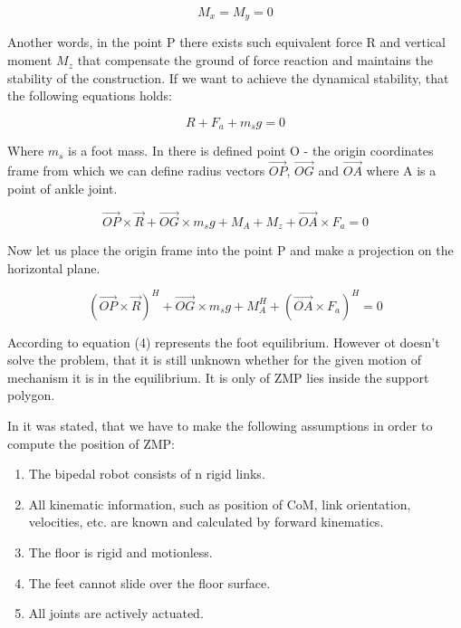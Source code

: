\documentclass[11pt,a4paper]{article}
\begin{document}
	\begin{equation}
		M_x = M_y = 0
	\end{equation}

Another words, in the point P there exists such equivalent force R and vertical moment $M_z$ that compensate the ground of force reaction and maintains the stability of the construction. If we want to achieve the dynamical stability, that the following equations holds:

	\begin{equation}
		R + F_a + m_sg = 0
	\end{equation}

Where $m_s$ is a foot mass. In \cite{vukobratovic2004zero} there is defined  point O - the origin coordinates frame from which we can define radius vectors $\vec{OP}$, $\vec{OG}$ and $\vec{OA}$ where A is a point of ankle joint.

	\begin{equation}
		\vec{OP} \times \vec{R} + \vec{OG} \times m_sg + M_A + M_z + \vec{OA} \times F_a = 0
	\end{equation}

Now let us place the origin frame into the point P and make a projection on the horizontal plane. 

	\begin{equation}
		(\vec{OP} \times \vec{R})^H + \vec{OG} \times m_sg + M_A^H + (\vec{OA} \times F_a)^H = 0
	\end{equation}

According to \cite{vukobratovic2004zero} equation (4) represents the foot equilibrium. However ot doesn't solve the problem, that it is still unknown whether for the given motion of mechanism it is in the equilibrium. It is only of ZMP lies inside the support polygon.

In \cite{dekker2009zero} it was stated, that we have to make the following assumptions in order to compute the position of ZMP:

	\begin{enumerate}
		\item
			The bipedal robot consists of n rigid links.
		\item
			All kinematic information, such as position of CoM, link orientation, velocities, etc. are known and calculated by forward kinematics.
		\item
			The floor is rigid and motionless.
		\item
			The feet cannot slide over the floor surface.
		\item
			All joints are actively actuated.
	\end{enumerate}
	
\end{document}
